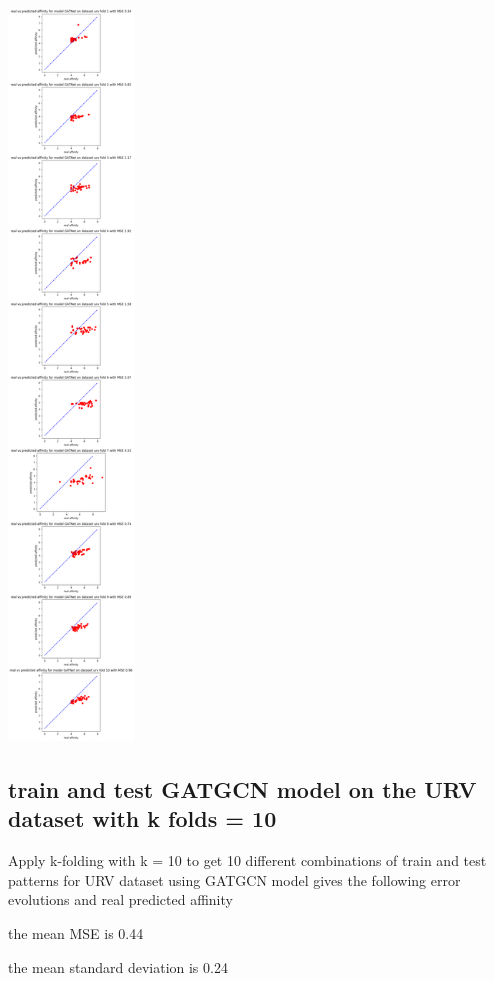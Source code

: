 \documentclass[11pt, a4paper]{article}
\begin{document}
    \begin{center}
        \includegraphics[width=0.25\textwidth]{GAT_folds10predictions.png}
    \end{center}

    \subsection{train and test GATGCN model on the URV dataset with k folds = 10}
    Apply k-folding with k = 10 to get 10 different combinations of train and test patterns for URV dataset using GATGCN model gives the following error evolutions and real predicted affinity
    
    the mean MSE is 0.44

    the mean standard deviation is 0.24
\end{document}
